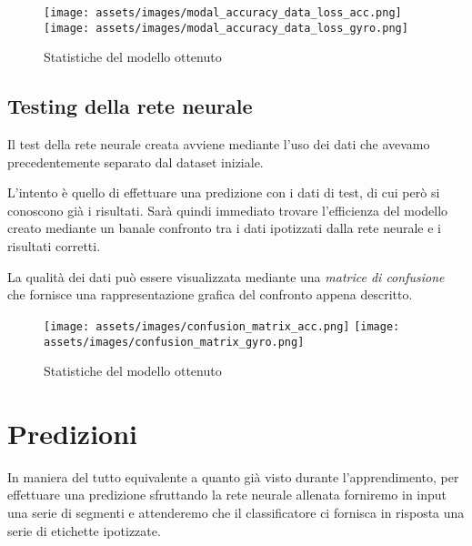 \begin{figure}[H]
    \centering
    \texttt{[image: assets/images/modal\_accuracy\_data\_loss\_acc.png]}
    \centering
    \texttt{[image: assets/images/modal\_accuracy\_data\_loss\_gyro.png]}
    \caption{Statistiche del modello ottenuto}
\end{figure}

\subsection{Testing della rete neurale}
Il test della rete neurale creata avviene mediante l'uso dei dati che avevamo precedentemente separato dal dataset iniziale.

L'intento è quello di effettuare una predizione con i dati di test, di cui però si conoscono già i risultati. 
Sarà quindi immediato trovare l'efficienza del modello creato mediante un banale confronto tra i dati ipotizzati 
dalla rete neurale e i risultati corretti.

La qualità dei dati può essere visualizzata mediante una \textit{matrice di confusione} che fornisce una rappresentazione grafica del confronto appena descritto.

\begin{figure}[H]
    \centering
    \texttt{[image: assets/images/confusion\_matrix\_acc.png]}
    \centering
    \texttt{[image: assets/images/confusion\_matrix\_gyro.png]}
    \caption{Statistiche del modello ottenuto}
\end{figure}

\section{Predizioni}
In maniera del tutto equivalente a quanto già visto durante l'apprendimento, per effettuare una predizione sfruttando
la rete neurale allenata forniremo in input una serie di segmenti e attenderemo che il classificatore ci fornisca in risposta
una serie di etichette ipotizzate.

